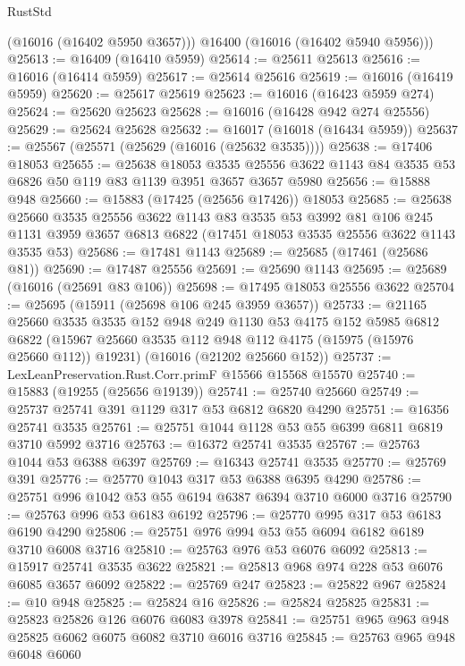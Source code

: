 \begin{lexlean}{RustStd}
\begin{coremodule}
        (@16016 (@16402 @5950 @3657)))
      @16400
      (@16016 (@16402 @5940 @5956)))
@25613 := @16409 (@16410 @5959)
@25614 := @25611 @25613
@25616 := @16016 (@16414 @5959)
@25617 := @25614 @25616
@25619 := @16016 (@16419 @5959)
@25620 := @25617 @25619
@25623 := @16016 (@16423 @5959 @274)
@25624 := @25620 @25623
@25628 := @16016 (@16428 @942 @274 @25556)
@25629 := @25624 @25628
@25632 := @16017 (@16018 (@16434 @5959))
@25637 := @25567 (@25571 (@25629 (@16016 (@25632 @3535))))
@25638 := @17406 @18053
@25655 := @25638
    @18053
    @3535
    @25556
    @3622
    @1143
    @84
    @3535
    @53
    @6826
    @50
    @119
    @83
    @1139
    @3951
    @3657
    @3657
    @5980
@25656 := @15888 @948
@25660 := @15883 (@17425 (@25656 @17426)) @18053
@25685 := @25638
    @25660
    @3535
    @25556
    @3622
    @1143
    @83
    @3535
    @53
    @3992
    @81
    @106
    @245
    @1131
    @3959
    @3657
    @6813
    @6822
    (@17451 @18053 @3535 @25556 @3622 @1143 @3535 @53)
@25686 := @17481 @1143
@25689 := @25685 (@17461 (@25686 @81))
@25690 := @17487 @25556
@25691 := @25690 @1143
@25695 := @25689 (@16016 (@25691 @83 @106))
@25698 := @17495 @18053 @25556 @3622
@25704 := @25695 (@15911 (@25698 @106 @245 @3959 @3657))
@25733 := @21165
    @25660
    @3535
    @3535
    @152
    @948
    @249
    @1130
    @53
    @4175
    @152
    @5985
    @6812
    @6822
    (@15967 @25660 @3535 @112 @948 @112 @4175 (@15975 (@15976 @25660 @112)) @19231)
    (@16016 (@21202 @25660 @152))
@25737 := LexLeanPreservation.Rust.Corr.primF @15566 @15568 @15570
@25740 := @15883 (@19255 (@25656 @19139))
@25741 := @25740 @25660
@25749 := @25737 @25741 @391 @1129 @317 @53 @6812 @6820 @4290
@25751 := @16356 @25741 @3535
@25761 := @25751 @1044 @1128 @53 @55 @6399 @6811 @6819 @3710 @5992 @3716
@25763 := @16372 @25741 @3535
@25767 := @25763 @1044 @53 @6388 @6397
@25769 := @16343 @25741 @3535
@25770 := @25769 @391
@25776 := @25770 @1043 @317 @53 @6388 @6395 @4290
@25786 := @25751 @996 @1042 @53 @55 @6194 @6387 @6394 @3710 @6000 @3716
@25790 := @25763 @996 @53 @6183 @6192
@25796 := @25770 @995 @317 @53 @6183 @6190 @4290
@25806 := @25751 @976 @994 @53 @55 @6094 @6182 @6189 @3710 @6008 @3716
@25810 := @25763 @976 @53 @6076 @6092
@25813 := @15917 @25741 @3535 @3622
@25821 := @25813 @968 @974 @228 @53 @6076 @6085 @3657 @6092
@25822 := @25769 @247
@25823 := @25822 @967
@25824 := @10 @948
@25825 := @25824 @16
@25826 := @25824 @25825
@25831 := @25823 @25826 @126 @6076 @6083 @3978
@25841 := @25751 @965 @963 @948 @25825 @6062 @6075 @6082 @3710 @6016 @3716
@25845 := @25763 @965 @948 @6048 @6060

\end{coremodule}
\end{lexlean}
